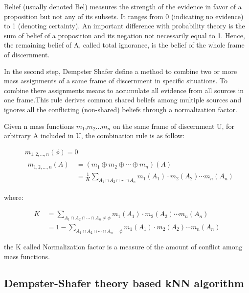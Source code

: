 \documentclass[runningheads]{llncs}
\begin{document}
Belief (usually denoted Bel) measures the strength of the evidence in favor of a proposition but not any of its subsets. It ranges from 0 (indicating no evidence) to 1 (denoting certainty). An important difference with probability theory is the sum of belief of a proposition and its negation not necessarily equal to 1. Hence, the remaining belief of A, called total ignorance, is the belief of the whole frame of discernment.

In the second step, Dempster Shafer define a method to combine two or more mass assignments of a same frame of discernment in specific situations. To combine there assignments means to accumulate all evidence from all sources in one frame.This rule derives common shared beliefs among multiple sources and ignores all the conflicting (non-shared) beliefs through a normalization factor. 

Given n mass functions $m_1$,$m_2$...$m_n$ on the same frame of discernment U, for arbitrary A  included in U, the combination rule is as follow:


\begin{equation}
\begin{split}
&\ m_{1,2,...,n}(\phi) = 0\\
&\ 
\begin{split}
m_{1,2,...,n}(A)  &\ =(m_1\oplus m_2 \oplus \cdots 
\oplus m_n)(A) \\
&\ = \frac{1}{K} \sum_{A_1 \cap A_2 \cap \cdots
\cap A_n} m_1(A_1) \cdot m_2(A_2) \cdots m_n(A_n)
\end{split}
\end{split}
\end{equation}

where:

\begin{equation}
\begin{split}
K &\ = \sum_{A_1 \cap A_2 \cap \cdots
\cap A_n \ne \phi} m_1(A_1) \cdot m_2(A_2) \cdots m_n(A_n) \\
&\ = 1 - \sum_{A_1 \cap A_2 \cap \cdots
\cap A_n = \phi} m_1(A_1) \cdot m_2(A_2) \cdots m_n(A_n) 
\end{split}
\end{equation}

the K called Normalization factor is a measure of the amount of conflict among mass functions. 

\subsection{Dempster-Shafer theory based kNN algorithm}
\end{document}
